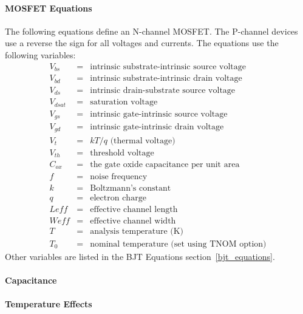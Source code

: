 \paragraph{MOSFET Equations}
The following equations define an N-channel MOSFET. The P-channel
devices use a reverse the sign for all voltages and currents.  The
equations use the following variables:
\begin{eqnarray*}
V_{bs}  &=&\mbox{intrinsic substrate-intrinsic source voltage} \\
V_{bd}  &=&\mbox{intrinsic substrate-intrinsic drain voltage} \\
V_{ds}  &=&\mbox{intrinsic drain-substrate source voltage} \\
V_{dsat}&=&\mbox{saturation voltage} \\
V_{gs}  &=&\mbox{intrinsic gate-intrinsic source voltage} \\
V_{gd}  &=&\mbox{intrinsic gate-intrinsic drain voltage} \\
V_t     &=&kT / q \mbox{ (thermal voltage)} \\
V_{th}  &=&\mbox{threshold voltage} \\
C_{ox}  &=&\mbox{the gate oxide capacitance per unit area} \\
f       &=&\mbox{noise frequency} \\
k       &=&\mbox{Boltzmann's constant} \\
q       &=&\mbox{electron charge} \\
Leff    &=&\mbox{effective channel length} \\
Weff    &=&\mbox{effective channel width} \\
T       &=&\mbox{analysis temperature (K)} \\
T_0     &=&\mbox{nominal temperature (set using TNOM option)}
\end{eqnarray*}
Other variables are listed in the BJT Equations section~\ref{bjt_equations}.

\clearpage
{}

\paragraph{Capacitance}

\clearpage
\paragraph{Temperature Effects}

